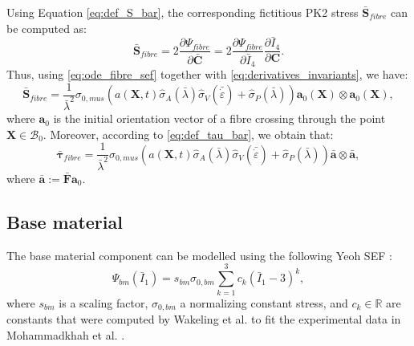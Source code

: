 \documentclass{sfuthesis}
\numberwithin{equation}{section}
\numberwithin{figure}{chapter}
\numberwithin{table}{chapter}
\theoremstyle{definition}
\def\*#1{{\mathbf{#1}}} %
\newcommand{\pder}[2]{\dfrac{\partial #1}{\partial #2}}
\newcommand{\depsilon}{\dot{\varepsilon}}
\newcommand{\R}{\mathbb{R}}
\newcommand{\B}{\mathcal{B}}
\newcommand{\I}{{\bar{I}}}
\def\btau{{\bm{\tau}}}
\begin{document}

Using Equation \eqref{eq:def_S_bar}, the corresponding fictitious PK2 stress $\bar{\*S}_{fibre}$ can be computed as:
\begin{equation}
    \bar{\*S}_{fibre} = 2 \pder{\Psi_{fibre}}{\bar{\*C}} = 2 \pder{\Psi_{fibre}}{\I_4} \pder{\I_4}{\*C}.
\end{equation}
Thus, using \eqref{eq:ode_fibre_sef} together with \eqref{eq:derivatives_invariants}, we have:
\begin{equation} \label{eq:def_S_fibre}
    \bar{\*S}_{fibre} = \dfrac{1}{\bar{\lambda}^2} \sigma_{0,mus} \left( a(\*X,t) \widehat{\sigma}_A(\bar{\lambda}) \widehat{\sigma}_V(\bar{\depsilon}) + \widehat{\sigma}_P(\bar{\lambda}) \right) \*a_0(\*X) \otimes \*a_0(\*X),
\end{equation}
where $\*a_0$ is the initial orientation vector of a fibre crossing through the point $\*X \in \B_0$. Moreover, according to \eqref{eq:def_tau_bar}, we obtain that:
\begin{equation} \label{eq:def_tau_bar_fibre}
    \bar{\btau}_{fibre} = \dfrac{1}{\bar{\lambda}^2} \sigma_{0,mus} \left( a(\*X,t) \widehat{\sigma}_A(\bar{\lambda}) \widehat{\sigma}_V(\bar{\depsilon}) + \widehat{\sigma}_P(\bar{\lambda}) \right) \bar{\*a} \otimes \bar{\*a},
\end{equation}
where $\bar{\*a} := \bar{\*F}\*a_0$.

\subsection{Base material}

The base material component can be modelled using the following Yeoh SEF \cite{Paper3_RossEtAl2021, Paper2_RyanEtAl2020, Paper1_WakelingEtAl2020}:
\begin{equation}\label{eq:def_Psi_bm}
    \Psi_{bm}(\I_1) = s_{bm} \sigma_{0,bm} \sum_{k=1}^3 c_k (\I_1 - 3)^k,
\end{equation}
where $s_{bm}$ is a scaling factor, $\sigma_{0,bm}$ a normalizing constant stress, and $c_k \in \R$ are constants that were computed by Wakeling et al. \cite{Paper1_WakelingEtAl2020} to fit the experimental data in Mohammadkhah et al. \cite{Mohammadkhah2016}.
\end{document}
